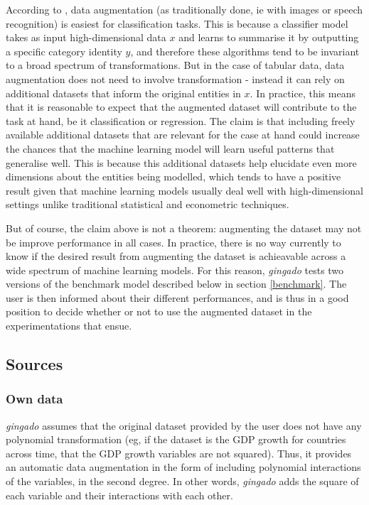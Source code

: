 \documentclass{article}
\begin{document}
According to \cite{DeepLearning}, data augmentation (as traditionally done, ie with images or speech recognition) is easiest for classification tasks. This is because a classifier model takes as input high-dimensional data $x$ and learns to summarise it by outputting a specific category identity $y$, and therefore these algorithms tend to be invariant to a broad spectrum of transformations. But in the case of tabular data, data augmentation does not need to involve transformation - instead it can rely on additional datasets that inform the original entities in $x$. In practice, this means that it is reasonable to expect that the augmented dataset will contribute to the task at hand, be it classification or regression. The claim is that including freely available additional datasets that are relevant for the case at hand could increase the chances that the machine learning model will learn useful patterns that generalise well. This is because this additional datasets help elucidate even more dimensions about the entities being modelled, which tends to have a positive result given that machine learning models usually deal well with high-dimensional settings unlike traditional statistical and econometric techniques. 

But of course, the claim above is not a theorem: augmenting the dataset may not be improve performance in all cases. In practice, there is no way currently to know if the desired result from augmenting the dataset is achieavable across a wide spectrum of machine learning models. For this reason, \textit{gingado} tests two versions of the benchmark model described below in section \ref{benchmark}. The user is then informed about their different performances, and is thus in a good position to decide whether or not to use the augmented dataset in the experimentations that ensue.

\subsection{Sources}

\subsubsection{Own data}

\textit{gingado} assumes that the original dataset provided by the user does not have any polynomial transformation (eg, if the dataset is the GDP growth for countries across time, that the GDP growth variables are not squared). Thus, it provides an automatic data augmentation in the form of including polynomial interactions of the variables, in the second degree. In other words, \textit{gingado} adds the square of each variable and their interactions with each other.
\end{document}

